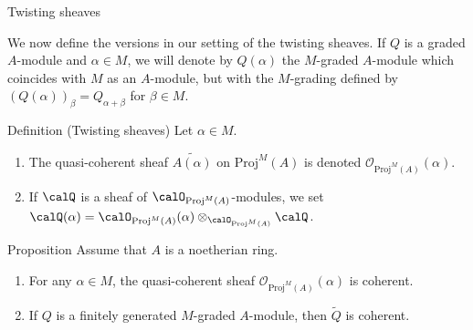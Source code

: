 \documentclass[9pt]{beamer}
\begin{document}
\begin{frame}{Twisting sheaves}

We now define the versions in our setting of the twisting sheaves. 
If $Q$ is a graded $A$-module and $\alpha \in M$, we will denote by $Q(\alpha)$ the $M$-graded $A$-module which coincides with $M$ as an $A$-module, but with the $M$-grading defined by $(Q(\alpha))_\beta = Q_{\alpha+\beta}$ for $\beta \in M$.


\begin{block}{Definition (Twisting sheaves)}
Let $\alpha \in M$.
\begin{enumerate}
\item
The quasi-coherent sheaf $\widetilde{A(\alpha)}$ on $\mathrm{Proj}^M(A)$ is 
denoted $\mathcal{O}_{\mathrm{Proj}^M(A)} (\alpha)$.
\item
If $\calQ$ is a sheaf of $\calO_{\mathrm{Proj}^M(A)}$-modules, we set $\calQ (\alpha) = \calO_{\mathrm{Proj}^M(A)} (\alpha ) \otimes_{\calO_{\mathrm{Proj}^M(A)}} \calQ$.
\end{enumerate}
\end{block}


\begin{block}{Proposition}
Assume that $A$ is a noetherian ring.
\begin{enumerate}
\item
For any $\alpha \in M$, the quasi-coherent sheaf $\mathcal{O}_{\mathrm{Proj}^M(A)} (\alpha)$ is coherent.
\item
If $Q$ is a finitely generated $M$-graded $A$-module, then $\widetilde{Q}$ is coherent.
\end{enumerate}
\end{block}


\end{frame}
\end{document}
